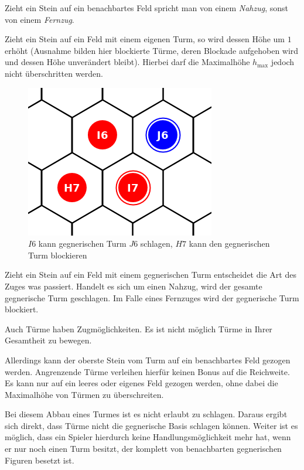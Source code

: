 Zieht ein Stein auf ein benachbartes Feld spricht man von einem \emph{Nahzug}, sonst von einem \emph{Fernzug}.

\newpage
Zieht ein Stein auf ein Feld mit einem eigenen Turm, so wird dessen Höhe um $1$ erhöht (Ausnahme bilden hier blockierte Türme, deren Blockade aufgehoben wird und dessen Höhe unverändert bleibt). Hierbei darf die Maximalhöhe $h_\text{max}$ jedoch nicht überschritten werden.

\begin{figure}[ht]
\begin{center}
\includegraphics[scale=0.25]{graphic/token-kick-block-tower.png}
\end{center}
\caption*{$I6$ kann gegnerischen Turm $J6$ schlagen, $H7$ kann den gegnerischen Turm blockieren}
\end{figure}

Zieht ein Stein auf ein Feld mit einem gegnerischen Turm entscheidet die Art des Zuges was passiert. Handelt es sich um einen Nahzug, wird der gesamte gegnerische Turm geschlagen. Im Falle eines Fernzuges wird der gegnerische Turm blockiert.
\newpage

Auch Türme haben Zugmöglichkeiten. Es ist nicht möglich Türme in Ihrer Gesamtheit zu bewegen. 

Allerdings kann der oberste Stein vom Turm auf ein benachbartes Feld gezogen werden. Angrenzende Türme verleihen hierfür keinen Bonus auf die Reichweite. Es kann nur auf ein leeres oder eigenes Feld gezogen werden, ohne dabei die Maximalhöhe von Türmen zu überschreiten.

Bei diesem Abbau eines Turmes ist es nicht erlaubt zu schlagen. Daraus ergibt sich direkt, dass Türme nicht die gegnerische Basis schlagen können. Weiter ist es möglich, dass ein Spieler hierdurch keine Handlungsmöglichkeit mehr hat, wenn er nur noch einen Turm besitzt, der komplett von benachbarten gegnerischen Figuren besetzt ist. 

